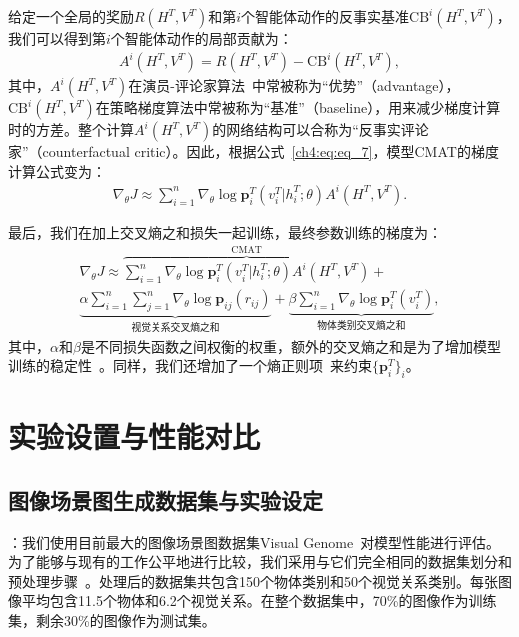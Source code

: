 给定一个全局的奖励$R(H^T, V^T)$和第$i$个智能体动作的反事实基准$\text{CB}^i(H^T, V^T)$，我们可以得到第$i$个智能体动作的局部贡献为：
\begin{align}
    A^i(H^T, V^T) = R(H^T, V^T) - \text{CB}^i(H^T, V^T),
\end{align}
其中，$A^i(H^T, V^T)$在演员-评论家算法~\cite{sutton2018reinforcement,mnih2016asynchronous}中常被称为“优势”（advantage），$\text{CB}^i(H^T, V^T)$在策略梯度算法中常被称为“基准”（baseline），用来减少梯度计算时的方差。整个计算$A^i(H^T, V^T)$的网络结构可以合称为“反事实评论家”（counterfactual critic）。因此，根据公式~\eqref{ch4:eq:eq_7}，模型CMAT的梯度计算公式变为：
\begin{align}
\nabla_{\theta} J \approx \sum^n_{i=1} \nabla_{\theta} \log \bm{p}^T_i (v^T_i|h^T_i; \theta) A^i(H^T, V^T).
\end{align}

最后，我们在加上交叉熵之和损失一起训练，最终参数训练的梯度为：
\begin{equation}
\begin{split}
\nabla_{\theta} J \approx  \overbrace{\sum^n_{i=1} \nabla_{\theta} \log \bm{p}^T_i (v^T_i|h^T_i; \theta) A^i(H^T, V^T)}^{\text{CMAT}} + \\
\underbrace{\alpha\sum^n_{i=1}\sum^n_{j=1} \nabla_{\theta} \log \bm{p}_{ij}(r_{ij})}_{\text{视觉关系交叉熵之和}} + 
\underbrace{\beta \sum^n_{i=1} \nabla_{\theta} \log \bm{p}^T_i(v^T_i)}_{\text{物体类别交叉熵之和}},
\end{split}
\end{equation}
其中，$\alpha$和$\beta$是不同损失函数之间权衡的权重，额外的交叉熵之和是为了增加模型训练的稳定性~\cite{rao2018learning}。同样，我们还增加了一个熵正则项~\cite{xu2015show, hu2017learning}来约束$\{\bm{p}^T_i\}_i$。


\section{实验设置与性能对比}
\subsection{图像场景图生成数据集与实验设定}

\textbf{}：我们使用目前最大的图像场景图数据集Visual Genome~\cite{krishna2017visual}对模型性能进行评估。为了能够与现有的工作公平地进行比较，我们采用与它们完全相同的数据集划分和预处理步骤~\cite{xu2017scene, zellers2018neural, newell2017pixels, yang2018graph, herzig2018mapping}。处理后的数据集共包含150个物体类别和50个视觉关系类别。每张图像平均包含11.5个物体和6.2个视觉关系。在整个数据集中，70\%的图像作为训练集，剩余30\%的图像作为测试集。


